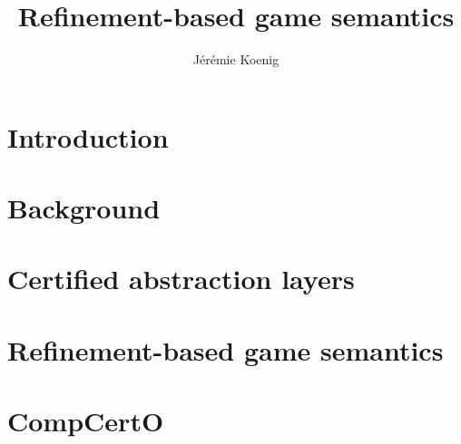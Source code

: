 \documentclass[draft]{report}
\title{Refinement-based game semantics}
\author{J\'er\'emie Koenig}
\begin{document}
\begin{abstract}
%
\end{abstract}

\titlepage

\tableofcontents

\chapter{Introduction}

\chapter{Background}

\chapter{Certified abstraction layers}

\chapter{Refinement-based game semantics}



\chapter{CompCertO}



\thebibliography
\end{document}
